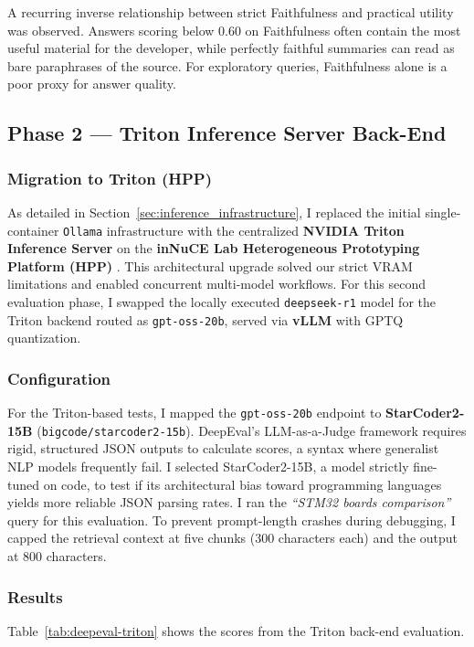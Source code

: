 A recurring inverse relationship between strict Faithfulness and practical utility was observed. Answers scoring below 0.60 on Faithfulness often contain the most useful material for the developer, while perfectly faithful summaries can read as bare paraphrases of the source. For exploratory queries, Faithfulness alone is a poor proxy for answer quality.

\subsection{Phase 2 --- Triton Inference Server Back-End}

\subsubsection{Migration to Triton (HPP)}
As detailed in Section~\ref{sec:inference_infrastructure}, I replaced the initial single-container \texttt{Ollama} infrastructure with the centralized \textbf{NVIDIA Triton Inference Server} on the \textbf{inNuCE Lab Heterogeneous Prototyping Platform (HPP)} \cite{innuce_website}. This architectural upgrade solved our strict VRAM limitations and enabled concurrent multi-model workflows. For this second evaluation phase, I swapped the locally executed \texttt{deepseek-r1} model for the Triton backend routed as \texttt{gpt-oss-20b}, served via \textbf{vLLM} with GPTQ quantization.

\subsubsection{Configuration}
For the Triton-based tests, I mapped the \texttt{gpt-oss-20b} endpoint to \textbf{StarCoder2-15B} (\texttt{bigcode/starcoder2-15b}). DeepEval's LLM-as-a-Judge framework requires rigid, structured JSON outputs to calculate scores, a syntax where generalist NLP models frequently fail. I selected StarCoder2-15B, a model strictly fine-tuned on code, to test if its architectural bias toward programming languages yields more reliable JSON parsing rates. I ran the \textit{``STM32 boards comparison''} query for this evaluation. To prevent prompt-length crashes during debugging, I capped the retrieval context at five chunks (300 characters each) and the output at 800 characters.

\subsubsection{Results}
Table~\ref{tab:deepeval-triton} shows the scores from the Triton back-end evaluation.

